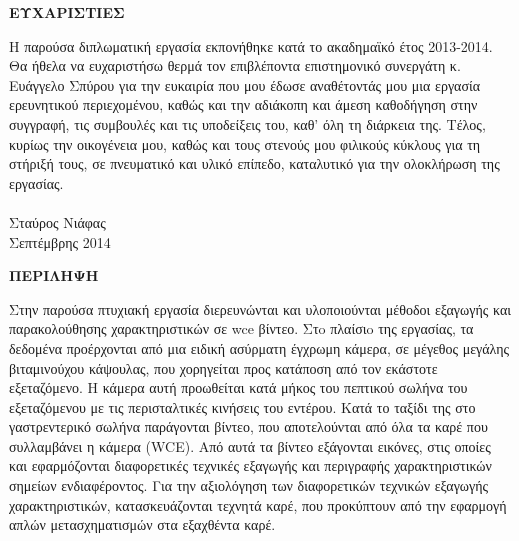 \thispagestyle{empty}


\begin{center}
\Large
{\bf ΕΥΧΑΡΙΣΤΙΕΣ}\\[15mm]
\end{center}

Η παρούσα διπλωματική εργασία εκπονήθηκε κατά το ακαδημαϊκό έτος 2013-2014. Θα ήθελα να ευχαριστήσω θερμά τον επιβλέποντα επιστημονικό συνεργάτη κ. Ευάγγελο Σπύρου για την
ευκαιρία που μου έδωσε αναθέτοντάς μου μια εργασία ερευνητικού περιεχομένου, καθώς και την αδιάκοπη και άμεση καθοδήγηση στην συγγραφή, 
τις συμβουλές και τις υποδείξεις του, καθ' όλη τη διάρκεια της.
Τέλος, κυρίως την οικογένεια μου, καθώς και τους στενούς μου φιλικούς κύκλους για τη στήριξή τους, σε πνευματικό και υλικό επίπεδο, καταλυτικό για την ολοκλήρωση της εργασίας. \\ \\Σταύρος Νιάφας\\
Σεπτέμβρης 2014

\newpage


\begin{center}
\Large
{\bf ΠΕΡΙΛΗΨΗ}\\[15mm]
\end{center}

Στην παρούσα πτυχιακή εργασία διερευνώνται και υλοποιούνται μέθοδοι εξαγωγής και παρακολούθησης χαρακτηριστικών σε wce βίντεο. Στo πλαίσιo της εργασίας, 
τα δεδομένα προέρχονται από μια ειδική ασύρματη έγχρωμη κάμερα, σε μέγεθος μεγάλης βιταμινούχου κάψουλας, που χορηγείται προς κατάποση από τον εκάστοτε εξεταζόμενο.
Η κάμερα αυτή προωθείται κατά μήκος του πεπτικού σωλήνα του εξεταζόμενου με τις περισταλτικές κινήσεις του εντέρου. Κατά το ταξίδι της στο γαστρεντερικό σωλήνα παράγονται βίντεο, 
που αποτελούνται από όλα τα καρέ που συλλαμβάνει η κάμερα (WCE).
Από αυτά τα βίντεο εξάγονται εικόνες, στις οποίες και εφαρμόζονται διαφορετικές τεχνικές εξαγωγής και περιγραφής χαρακτηριστικών σημείων ενδιαφέροντος. Για την αξιολόγηση των διαφορετικών τεχνικών εξαγωγής χαρακτηριστικών,
κατασκευάζονται τεχνητά καρέ, που προκύπτουν από την εφαρμογή απλών μετασχηματισμών στα εξαχθέντα καρέ.

\vspace{50mm}


